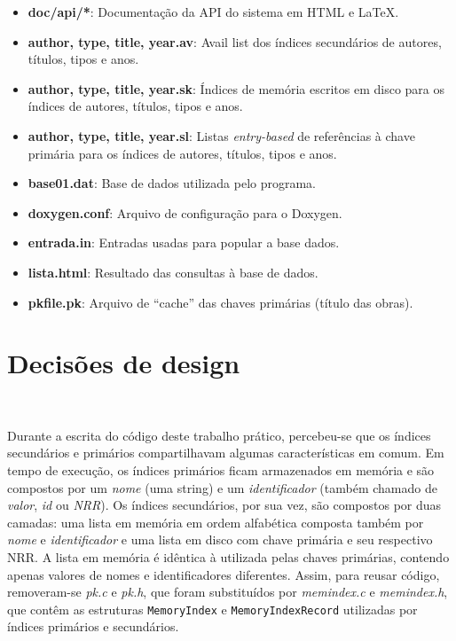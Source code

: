 \documentclass{article}
\begin{document}
\begin{itemize}
 \item \textbf{doc/api/*}: Documentação da API do sistema em HTML e LaTeX.
 \item \textbf{author, type, title, year.av}: Avail list dos índices secundários de autores, títulos, tipos e anos.
 \item \textbf{author, type, title, year.sk}: Índices de memória escritos em disco para os índices de autores, títulos, tipos e anos.
 \item \textbf{author, type, title, year.sl}: Listas \textit{entry-based} de referências à chave primária para os índices de autores, títulos, tipos e anos.
 \item \textbf{base01.dat}: Base de dados utilizada pelo programa.
 \item \textbf{doxygen.conf}: Arquivo de configuração para o Doxygen.
 \item \textbf{entrada.in}: Entradas usadas para popular a base dados.
 \item \textbf{lista.html}: Resultado das consultas à base de dados.
 \item \textbf{pkfile.pk}: Arquivo de ``cache'' das chaves primárias (título das obras).
\end{itemize}

\section{Decisões de design}\

Durante a escrita do código deste trabalho prático, percebeu-se que os índices secundários e primários compartilhavam algumas características em comum. Em tempo de execução, os índices primários ficam armazenados em memória e são compostos por um \textit{nome} (uma string) e um \textit{identificador} (também chamado de \textit{valor}, \textit{id} ou \textit{NRR}). Os índices secundários, por sua vez, são compostos por duas camadas: uma lista em memória em ordem alfabética composta também por \textit{nome} e \textit{identificador} e uma lista em disco com chave primária e seu respectivo NRR. A lista em memória é idêntica à utilizada pelas chaves primárias, contendo apenas valores de nomes e identificadores diferentes. Assim, para reusar código, removeram-se \textit{pk.c} e \textit{pk.h}, que foram substituídos por \textit{memindex.c} e \textit{memindex.h}, que contêm as estruturas \texttt{MemoryIndex} e \texttt{MemoryIndexRecord} utilizadas por índices primários e secundários.\\
\end{document}
